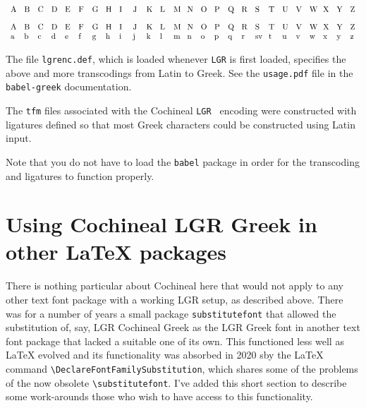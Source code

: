 \documentclass[11pt]{article}
\begin{document}
\newpage
\[\begin{array}{m{7pt}m{7pt}m{7pt}m{7pt}m{7pt}m{7pt}m{7pt}m{7pt}m{7pt}m{7pt}m{7pt}m{7pt}m{7pt}m{7pt}m{7pt}m{7pt}m{7pt}m{7pt}m{7pt}m{7pt}m{7pt}m{7pt}m{7pt}m{7pt}m{7pt}m{7pt}}
A & B & C & D & E & F & G & H & I & J & K & L & M & N & O & P & Q & R & S & T & U & V & W & X & Y & Z  \\ 
\end{array}\]
\selectfont
\[\begin{array}{m{7pt}m{7pt}m{7pt}m{7pt}m{7pt}m{7pt}m{7pt}m{7pt}m{7pt}m{7pt}m{7pt}m{7pt}m{7pt}m{7pt}m{7pt}m{7pt}m{7pt}m{7pt}m{7pt}m{7pt}m{7pt}m{7pt}m{7pt}m{7pt}m{7pt}m{7pt}}
A & B & C & D & E & F & G & H & I & J & K & L & M & N & O & P & Q & R & S & T & U & V & W & X & Y & Z  \\  
    a & b & c & d & e & f & g & h & i & j & k & l & m & n & o & p & q & r & sv & t & u & v & w & x & y & z \\ 
\end{array}\]
\selectfont

The file {\tt lgrenc.def}, which is loaded whenever {\tt LGR} is first loaded, specifies the above and more transcodings from Latin to Greek. See the {\tt usage.pdf} file in the {\tt babel-greek} documentation. 

The {\tt tfm} files associated with the Cochineal {\tt LGR } encoding were constructed with ligatures defined so that most Greek characters could be constructed using Latin input.

Note that you do not have to load the {\tt babel} package in order for the transcoding and ligatures to function properly.
\section*{Using Cochineal LGR Greek in other LaTeX packages}
There is nothing particular about Cochineal here that would not apply to any other text font package with a working LGR setup, as described above. There was for a number of years a small package {\tt substitutefont} that allowed the substitution of, say, LGR Cochineal Greek as the LGR Greek font in another text font package that lacked a suitable one of its own. This functioned less well as LaTeX evolved and its functionality was absorbed in 2020 sby the LaTeX command \verb|\DeclareFontFamilySubstitution|, which shares some of the problems of the now obsolete \verb|\substitutefont|. I've added this short section to describe some work-arounds those who wish to have access to this functionality.
\end{document}

